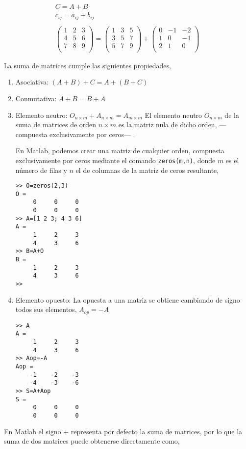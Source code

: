 \begin{gather*}
C=A+B\\
c_{ij}=a_{ij}+b_{ij}\\
\\
\begin{pmatrix}
1& 2& 3\\
4& 5& 6\\
7& 8& 9\\
\end{pmatrix} =
\begin{pmatrix}
1& 3& 5\\
3& 5& 7\\
5& 7& 9\\
\end{pmatrix} +
\begin{pmatrix}
0& -1& -2\\
1& 0& -1\\
2& 1& 0\\
\end{pmatrix}
\end{gather*}

La suma de matrices cumple las siguientes propiedades,
\begin{enumerate}
\item Asociativa: $(A+B)+C=A+(B+C)$
\item Conmutativa: $A+B=B+A$
\item Elemento neutro: $O_{n\times m}+A_{n\times m}=A_{m\times m}$ El elemento neutro $O_{n\times m}$ de la suma de matrices de orden $n\times m$ es la matriz nula de dicho orden, ---compuesta exclusivamente por ceros--- . 

En Matlab, podemos crear una matriz de cualquier orden, compuesta exclusivamente por ceros mediante el comando \texttt{zeros(m,n)}, donde $m$ es el número de filas y $n$ el de columnas de la matriz de ceros resultante,

\begin{verbatim}
>> O=zeros(2,3)
O =
     0     0     0
     0     0     0
>> A=[1 2 3; 4 3 6]
A =
     1     2     3
     4     3     6
>> B=A+O
B =
     1     2     3
     4     3     6
>> 
\end{verbatim}
\item Elemento opuesto: La opuesta a una matriz se obtiene cambiando de signo todos sus elementos, $A_{op}=-A$

\begin{verbatim}
>> A
A =
     1     2     3
     4     3     6
>> Aop=-A
Aop =
    -1    -2    -3
    -4    -3    -6
>> S=A+Aop
S =
     0     0     0
     0     0     0
\end{verbatim}
\end{enumerate}
En Matlab el signo $+$ representa por defecto la suma de matrices, por lo que la suma de dos matrices puede obtenerse directamente como, 

